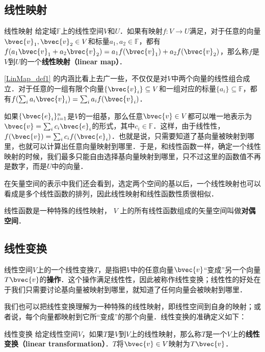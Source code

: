
\begin{issues}
\issueTODO
{}
\end{issues}



\subsection{线性映射}
\begin{definition}{线性映射}\label{LinMap_def1}
给定域$\mathbb{F}$上的线性空间$V$和$U$．如果有映射$f:V\rightarrow U$满足，对于任意的向量$\bvec{v}_1, \bvec{v}_2\in V$和标量$a_1, a_2\in\mathbb{F}$，都有$f(a_1\bvec{v}_1+a_2\bvec{v}_2)=a_1f(\bvec{v}_1)+a_2f(\bvec{v}_2)$，那么称$f$是$V$到$U$的一个\textbf{线性映射（linear map）}．
\end{definition}


\autoref{LinMap_def1} 的内涵比看上去广一些，不仅仅是对$V$中两个向量的线性组合成立．对于任意的一组有限个向量$\{\bvec{v}_i\}\subseteq V$和一组对应的标量$\{a_i\}\subseteq\mathbb{F}$，都有$f(\sum_i a_i\bvec{v}_i)=\sum_i a_if(\bvec{v}_i)$．

如果$\{\bvec{e}_i\}_{i=1}^n$是$V$的一组基，那么任意$\bvec{v}\in V$都可以唯一地表示为$\bvec{v}=\sum_i c_i\bvec{e}_i$的形式，其中$c_i\in\mathbb{F}$．这样，由于线性性，$f(\bvec{v})=\sum_ic_if(\bvec{e}_i)$．也就是说，只需要知道了基向量被映射到哪里，也就可以计算出任意向量映射到哪里．于是，和线性函数一样，确定一个线性映射的时候，我们最多只能自由选择基向量映射到哪里，只不过这里的函数值不再是数字，而是$U$中的向量．

在矢量空间的表示中我们还会看到，选定两个空间的基以后，一个线性映射也可以看成是多个线性函数的排列，因此线性映射和线性函数性质很相似．

线性函数是一种特殊的线性映射， $V$ 上的所有线性函数组成的矢量空间叫做\textbf{对偶空间}．

\subsection{线性变换}
线性空间$V$上的一个线性变换$T$，是指把$V$中的任意向量$\bvec{v}$“变成”另一个向量$T\bvec{v}$的\textbf{操作}．这个操作满足线性性，因此被称作线性变换；线性性的好处在于我们只需要讨论基向量被映射到哪里，就知道了任何向量会被映射到哪里．

我们也可以把线性变换理解为一种特殊的线性映射，即线性空间到自身的映射；或者说，每个向量都映射到它所“变成”的那个向量．线性变换的准确定义如下：

\begin{definition}{线性变换}
给定线性空间$V$，如果$T$是$V$到$V$上的线性映射，那么称$T$是一个$V$上的\textbf{线性变换（linear transformation）}．$T$将$\bvec{v}\in V$映射为$T\bvec{v}$．
\end{definition}
